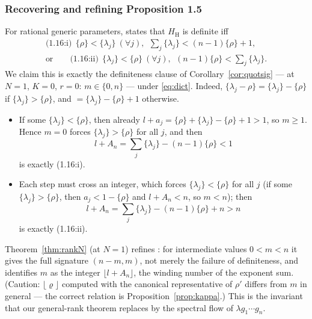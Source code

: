 \documentclass[11pt]{article}
\theoremstyle{definition}
\newcommand{\frc}[1]{\{#1\}}
\begin{document}
\subsubsection*{Recovering and refining Proposition 1.5}
For rational generic parameters, \cite[Proposition~1.5]{Haraoka1994}
states that $H_{\mathrm H}$ is definite iff
\begin{gather*}
\text{(1.16:i)}\ \ \frc\rho<\frc{\lambda_j}\ (\forall j),\ \
\sum_j\frc{\lambda_j}<(n-1)\frc\rho+1,\\
\text{or}\qquad
\text{(1.16:ii)}\ \ \frc{\lambda_j}<\frc\rho\ (\forall j),\ \
(n-1)\frc\rho<\sum_j\frc{\lambda_j}.
\end{gather*}
We claim this is exactly the definiteness clause of
Corollary~\ref{cor:quotsig} --- at $N=1$, $K=0$, $r=0$: $m\in\{0,n\}$
--- under \eqref{eq:dict}.
Indeed, $\frc{\lambda_j-\rho}=\frc{\lambda_j}-\frc\rho$ if
$\frc{\lambda_j}>\frc\rho$, and $=\frc{\lambda_j}-\frc\rho+1$ otherwise.
\begin{itemize}
\item[$m=0$:] If some $\frc{\lambda_j}<\frc\rho$, then already
$l+a_j=\frc\rho+\frc{\lambda_j}-\frc\rho+1>1$, so $m\ge1$. Hence $m=0$ forces
$\frc{\lambda_j}>\frc\rho$ for all $j$, and then
\[
l+A_n=\sum_j\frc{\lambda_j}-(n-1)\frc\rho<1
\]
is exactly (1.16:i).
\item[$m=n$:] Each step must cross an integer, which forces
$\frc{\lambda_j}<\frc\rho$ for all $j$ (if some $\frc{\lambda_j}>\frc\rho$,
then $a_j<1-\frc\rho$ and $l+A_n<n$, so $m<n$); then
\[
l+A_n=\sum_j\frc{\lambda_j}-(n-1)\frc\rho+n>n
\]
is exactly (1.16:ii).
\end{itemize}
Theorem~\ref{thm:rankN} (at $N=1$) refines \cite[Proposition~1.5]{Haraoka1994}: for
intermediate values $0<m<n$ it gives the full signature $(n-m,m)$, not merely
the failure of definiteness, and identifies $m$ as the integer $\lfloor l+A_n\rfloor$,
the winding number of the exponent sum. (Caution:
$\lfloor\varrho\rfloor$ computed with the canonical representative
of $\rho'$ differs from $m$ in general --- the correct relation is
Proposition~\ref{prop:kappa}.) This is the invariant that our general-rank theorem replaces
by the spectral flow of $\lambda g_1\cdots g_n$.
\end{document}
